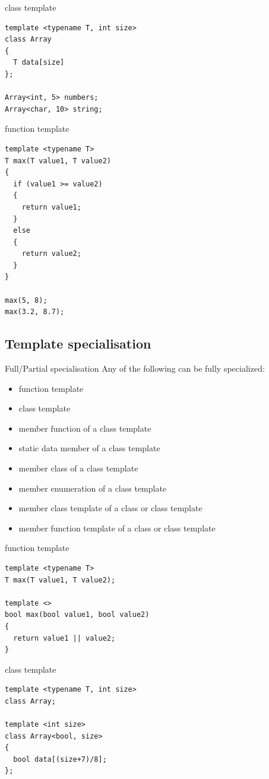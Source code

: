 \documentclass{beamer}
\begin{document}
\begin{frame}[fragile]{class template}
\begin{lstlisting}
template <typename T, int size>
class Array
{
  T data[size]
};

Array<int, 5> numbers;
Array<char, 10> string;
\end{lstlisting}
\end{frame}

\begin{frame}[fragile]{function template}
\begin{lstlisting}
template <typename T>
T max(T value1, T value2)
{
  if (value1 >= value2)
  {
    return value1;
  }
  else
  {
    return value2;
  }
}

max(5, 8);
max(3.2, 8.7);
\end{lstlisting}
\end{frame}

\subsection{Template specialisation}
\begin{frame}{Full/Partial specialisation}
Any of the following can be fully specialized:
\begin{itemize}
  \item function template
  \item class template 
  \item member function of a class template
  \item static data member of a class template
  \item member class of a class template
  \item member enumeration of a class template
  \item member class template of a class or class template
  \item member function template of a class or class template
\end{itemize}
\end{frame}

\begin{frame}[fragile]{function template}
\begin{lstlisting}
template <typename T>
T max(T value1, T value2);

template <>
bool max(bool value1, bool value2)
{
  return value1 || value2; 
}
\end{lstlisting}
\end{frame}

\begin{frame}[fragile]{class template}
\begin{lstlisting}
template <typename T, int size>
class Array;

template <int size>
class Array<bool, size>
{
  bool data[(size+7)/8];
};
\end{lstlisting}
\end{frame}
\end{document}
